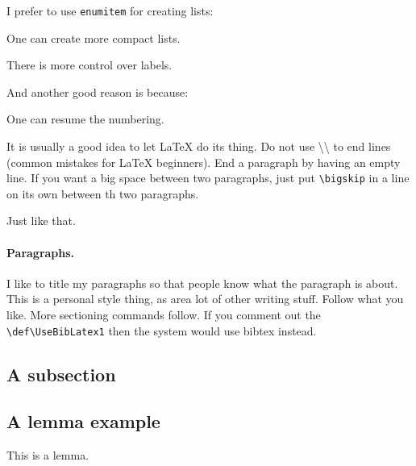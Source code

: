 \documentclass[12pt]{article}
\begin{document}
\bigskip

I prefer to use \texttt{enumitem} for creating lists:
\begin{compactenumI}
    \smallskip%
    \item One can create more compact lists.

    \smallskip%
    \item There is more control over labels.
\end{compactenumI}
\smallskip%
And another good reason is because:
\begin{compactenumI}[resume]
    \smallskip%
    \item One can resume the numbering.
\end{compactenumI}

\bigskip%

It is usually a good idea to let \LaTeX{} do its thing. Do not use
\textbackslash\textbackslash{} to end lines (common mistakes for
\LaTeX{} beginners). End a paragraph by having an empty line. If you
want a big space between two paragraphs, just put
\texttt{\textbackslash{big{}skip}} in a line on its own between th two
paragraphs.

\bigskip

Just like that.


\paragraph{Paragraphs.}

I like to title my paragraphs so that people know what the paragraph
is about. This is a personal style thing, as area lot of other writing
stuff. Follow what you like. More sectioning commands follow. If you
comment out the
\texttt{\textbackslash{}def\textbackslash{}UseBibLatex{1}} then the
system would use bibtex instead.

\subsection{A subsection}

\subsection{A lemma example}

\begin{lemma}
    This is a lemma.
\end{lemma}


\end{document}
